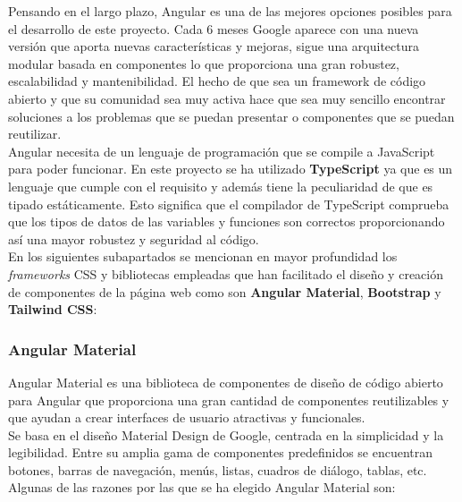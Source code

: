 Pensando en el largo plazo, Angular es una de las mejores opciones posibles para el desarrollo de este proyecto. Cada 6 meses
Google aparece con una nueva versión que aporta nuevas características y mejoras, sigue una
arquitectura modular basada en componentes lo que proporciona una gran robustez, escalabilidad y mantenibilidad. El hecho
de que sea un framework de código abierto y que su comunidad sea muy activa hace que sea muy sencillo encontrar
soluciones a los problemas que se puedan presentar o componentes que se puedan reutilizar. \\

Angular necesita de un lenguaje de programación que se compile a JavaScript para poder
funcionar. En este proyecto se ha utilizado \textbf{TypeScript} ya que es un lenguaje que cumple con el requisito y además
tiene la peculiaridad de que es tipado estáticamente. Esto significa que el compilador de TypeScript comprueba que los
tipos de datos de las variables y funciones son correctos proporcionando así una mayor robustez y seguridad al código. \\

En los siguientes subapartados se mencionan en mayor profundidad los \textit{frameworks} CSS y bibliotecas empleadas que
han facilitado el diseño y creación de componentes de la página web como son \textbf{Angular Material}, \textbf{Bootstrap} y \textbf{Tailwind CSS}:

\subsubsection{Angular Material}\label{subsubsec:angular-material}

Angular Material es una biblioteca de componentes de diseño de código abierto para Angular que proporciona
una gran cantidad de componentes reutilizables y que ayudan a crear interfaces de usuario atractivas y funcionales. \\

Se basa en el diseño Material Design de Google, centrada en la simplicidad y la legibilidad. Entre su amplia gama de
componentes predefinidos se encuentran botones, barras de navegación, menús, listas, cuadros de diálogo, tablas, etc. \\

Algunas de las razones por las que se ha elegido Angular Material son:

